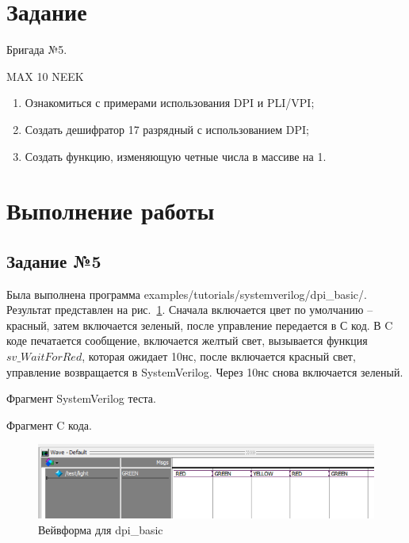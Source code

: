 \documentclass[a4paper,14pt]{article}
\begin{document}
    
    \tableofcontents
    \pagebreak


    \section{Задание}

    Бригада №5.

    MAX 10 NEEK

    \begin{enumerate}
        \item Ознакомиться с примерами использования DPI и PLI/VPI;
        \item Создать дешифратор 17 разрядный с использованием  DPI;
        \item Создать функцию, изменяющую четные числа в массиве на 1.
    \end{enumerate}


    \section{Выполнение работы}

    \subsection{Задание №5}

    Была выполнена программа examples/tutorials/systemverilog/dpi\_basic/.
    Результат представлен на рис.~\ref{fig:05_wave}.
    Сначала включается цвет по умолчанию -- красный, затем включается зеленый, после управление передается в С код.
    В C коде печатается сообщение, включается желтый свет, вызывается функция $sv\_WaitForRed$, которая ожидает 10нс,
    после включается красный свет, управление возвращается в SystemVerilog.
    Через 10нс снова включается зеленый.

    Фрагмент SystemVerilog теста.
    {\small {}}

    Фрагмент C кода.
    {\small {}}

    \begin{figure}[H]
        \centering
        \includegraphics[width=\linewidth]{images/05_wave}
        \caption{Вейвформа для dpi\_basic}
        \label{fig:05_wave}
    \end{figure}
\end{document}
